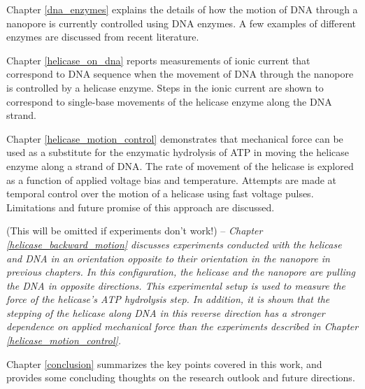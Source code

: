 Chapter \ref{dna_enzymes} explains the details of how the motion of DNA through a nanopore is currently controlled using DNA enzymes.  A few examples of different enzymes are discussed from recent literature.

Chapter \ref{helicase_on_dna} reports measurements of ionic current that correspond to DNA sequence when the movement of DNA through the nanopore is controlled by a helicase enzyme.  Steps in the ionic current are shown to correspond to single-base movements of the helicase enzyme along the DNA strand.

Chapter \ref{helicase_motion_control} demonstrates that mechanical force can be used as a substitute for the enzymatic hydrolysis of ATP in moving the helicase enzyme along a strand of DNA.  The rate of movement of the helicase is explored as a function of applied voltage bias and temperature.  Attempts are made at temporal control over the motion of a helicase using fast voltage pulses.  Limitations and future promise of this approach are discussed.

(This will be omitted if experiments don't work!) -- \textit{ Chapter \ref{helicase_backward_motion} discusses experiments conducted with the helicase and DNA in an orientation opposite to their orientation in the nanopore in previous chapters.  In this configuration, the helicase and the nanopore are pulling the DNA in opposite directions.  This experimental setup is used to measure the force of the helicase's ATP hydrolysis step.  In addition, it is shown that the stepping of the helicase along DNA in this reverse direction has a stronger dependence on applied mechanical force than the experiments described in Chapter \ref{helicase_motion_control}. }

Chapter \ref{conclusion} summarizes the key points covered in this work, and provides some concluding thoughts on the research outlook and future directions.